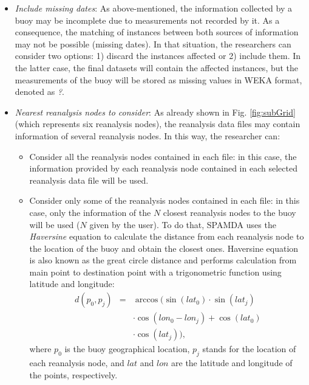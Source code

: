 \documentclass[energies,article,submit,moreauthors,pdftex]{Definitions/mdpi}
\begin{document}
\begin{itemize}
					\item \textit{Include missing dates}: As above-mentioned, the information collected by a buoy may be incomplete due to measurements not recorded by it. As a consequence, the matching of instances between both sources of information may not be possible (missing dates). In that situation, the researchers can consider two options: 1) discard the instances affected or 2) include them. In the latter case, the final datasets will contain the affected instances, but the measurements of the buoy will be stored as missing values in WEKA format, denoted as \guillemotleft\textit{?}\guillemotright.
					
					\item \textit{Nearest reanalysis nodes to consider}: As already shown in Fig. \ref{fig:subGrid} (which represents six reanalysis nodes), the reanalysis data files may contain information of several reanalysis nodes. In this way, the researcher can:
					
						\begin{itemize}
							
							\item Consider all the reanalysis nodes contained in each file: in this case, the information provided by each reanalysis node contained in each selected reanalysis data file will be used.
							
							\item Consider only some of the reanalysis nodes contained in each file: in this case, only the information of the $N$ closest reanalysis nodes to the buoy will be used  ($N$ given by the user). To do that, SPAMDA uses the \textit{Haversine} equation \cite{Haversine_2009} to calculate the distance from each reanalysis node to the location of the buoy and obtain the closest ones. Haversine equation is also known as the great circle distance and performs calculation from main point to destination point with a trigonometric function using latitude and longitude:
								\begin{eqnarray}
									\label{eq:Haversine}
									d(p_0,p_j) & = & \arccos(\sin(lat_0)\cdot \sin(lat_j) \nonumber \\
									& & \cdot \cos(lon_0-lon_j) + \cos(lat_0) \\
									& & \cdot \cos(lat_j)), \nonumber 
								\end{eqnarray}								
							where $p_0$ is the buoy geographical location, $p_j$ stands for the location of each reanalysis node, and $lat$ and $lon$ are the latitude and longitude of the points, respectively.
						\end{itemize}
					

\end{itemize}
\end{document}
